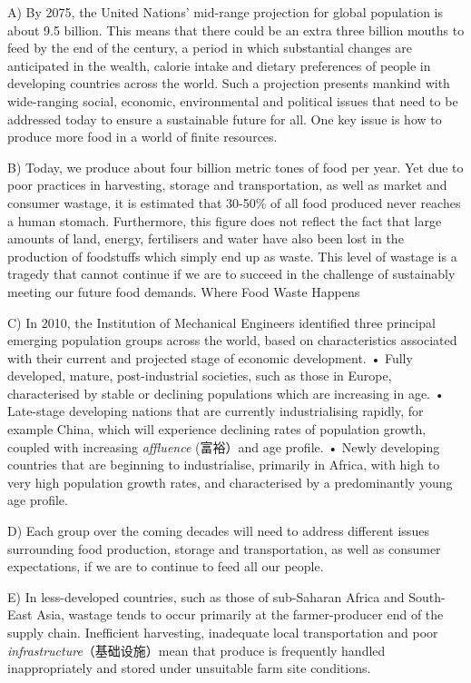 \documentclass[UTF8,11pt]{ctexart}
\begin{document}
A) By 2075, the United Nations’ mid-range projection for global population is about 9.5 billion. This means that there could be an extra three billion mouths to feed by the end of the century, a period in which substantial changes are anticipated in the wealth, calorie intake and dietary preferences of people in developing countries across the world. Such a projection presents mankind with wide-ranging social, economic, environmental and political issues that need to be addressed today to ensure a sustainable future for all. One key issue is how to produce more food in a world of finite resources.


B) Today, we produce about four billion metric tones of food per year. Yet due to poor practices in harvesting, storage and transportation, as well as market and consumer wastage, it is estimated that 30-50\% of all food produced never reaches a human stomach. Furthermore, this figure does not reflect the fact that large amounts of land, energy, fertilisers and water have also been lost in the production of foodstuffs which simply end up as waste. This level of wastage is a tragedy that cannot continue if we are to succeed in the challenge of sustainably meeting our future food demands. Where Food Waste Happens


C) In 2010, the Institution of Mechanical Engineers identified three principal emerging population groups across the world, based on characteristics associated with their current and projected stage of economic development. • Fully developed, mature, post-industrial societies, such as those in Europe, characterised by stable or declining populations which are increasing in age. • Late-stage developing nations that are currently industrialising rapidly, for example China, which will experience declining rates of population growth, coupled with increasing\textit{ affluence} (富裕）and age profile. • Newly developing countries that are beginning to industrialise, primarily in Africa, with high to very high population growth rates, and characterised by a predominantly young age profile.


D) Each group over the coming decades will need to address different issues surrounding food production, storage and transportation, as well as consumer expectations, if we are to continue to feed all our people.


E) In less-developed countries, such as those of sub-Saharan Africa and South-East Asia, wastage tends to occur primarily at the farmer-producer end of the supply chain. Inefficient harvesting, inadequate local transportation and poor \textit{infrastructure}（基础设施）mean that produce is frequently handled inappropriately and stored under unsuitable farm site conditions.
\end{document}
